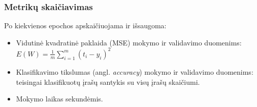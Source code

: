 \subsubsection{Metrikų skaičiavimas}
\label{subsubsec:metriku_skaiciavimas}

Po kiekvienos epochos apskaičiuojama ir išsaugoma:
\begin{itemize}
    \item Vidutinė kvadratinė paklaida (MSE) mokymo ir validavimo duomenims: $E(W) = \frac{1}{m} \sum_{i=1}^{m} (t_i - y_i)^2$
    \item Klasifikavimo tikslumas (angl. \textit{accuracy}) mokymo ir validavimo duomenims: teisingai klasifikuotų įrašų santykis su visų įrašų skaičiumi.
    \item Mokymo laikas sekundėmis.
\end{itemize}